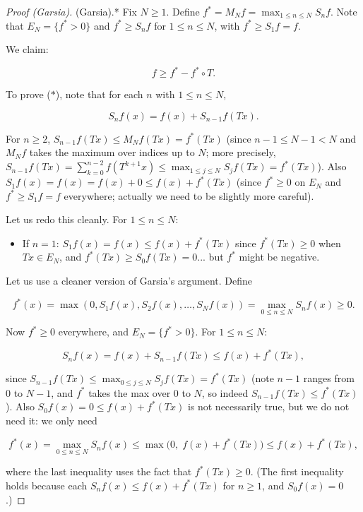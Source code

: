 \begin{proof}[Proof (Garsia)]
(Garsia).* Fix $N \geq 1$. Define $f^* = M_N f = \max_{1 \leq n \leq N} S_n f$. Note that $E_N = \{f^* > 0\}$ and $f^* \geq S_n f$ for $1 \leq n \leq N$, with $f^* \geq S_1 f = f$.

We claim:

\begin{equation}\label{eq:*}\tag{$*$}
f \geq f^* - f^* \circ T.
\end{equation}

To prove ($*$), note that for each $n$ with $1 \leq n \leq N$,

\[
S_n f(x) = f(x) + S_{n-1} f(Tx).
\]

For $n \geq 2$, $S_{n-1} f(Tx) \leq M_N f(Tx) = f^*(Tx)$ (since $n - 1 \leq N - 1 < N$ and $M_N f$ takes the maximum over indices up to $N$; more precisely, $S_{n-1}f(Tx) = \sum_{k=0}^{n-2} f(T^{k+1}x) \leq \max_{1 \leq j \leq N} S_j f(Tx) = f^*(Tx)$). Also $S_1 f(x) = f(x) = f(x) + 0 \leq f(x) + f^*(Tx)$ (since $f^* \geq 0$ on $E_N$ and $f^* \geq S_1 f = f$ everywhere; actually we need to be slightly more careful).

Let us redo this cleanly. For $1 \leq n \leq N$:
\begin{itemize}[nosep]
  \item If $n = 1$: $S_1 f(x) = f(x) \leq f(x) + f^*(Tx)$ since $f^*(Tx) \geq 0$ when $Tx \in E_N$, and $f^*(Tx) \geq S_0 f(Tx) = 0$... but $f^*$ might be negative.
\end{itemize}

Let us use a cleaner version of Garsia's argument. Define

\[
f^*(x) = \max(0, S_1 f(x), S_2 f(x), \ldots, S_N f(x)) = \max_{0 \leq n \leq N} S_n f(x) \geq 0.
\]

Now $f^* \geq 0$ everywhere, and $E_N = \{f^* > 0\}$. For $1 \leq n \leq N$:

\[
S_n f(x) = f(x) + S_{n-1} f(Tx) \leq f(x) + f^*(Tx),
\]

since $S_{n-1} f(Tx) \leq \max_{0 \leq j \leq N} S_j f(Tx) = f^*(Tx)$ (note $n - 1$ ranges from $0$ to $N - 1$, and $f^*$ takes the max over $0$ to $N$, so indeed $S_{n-1} f(Tx) \leq f^*(Tx)$). Also $S_0 f(x) = 0 \leq f(x) + f^*(Tx)$ is not necessarily true, but we do not need it: we only need

\[
f^*(x) = \max_{0 \leq n \leq N} S_n f(x) \leq \max\!\big(0,\; f(x) + f^*(Tx)\big) \leq f(x) + f^*(Tx),
\]

where the last inequality uses the fact that $f^*(Tx) \geq 0$. (The first inequality holds because each $S_n f(x) \leq f(x) + f^*(Tx)$ for $n \geq 1$, and $S_0 f(x) = 0$.)


\end{proof}
